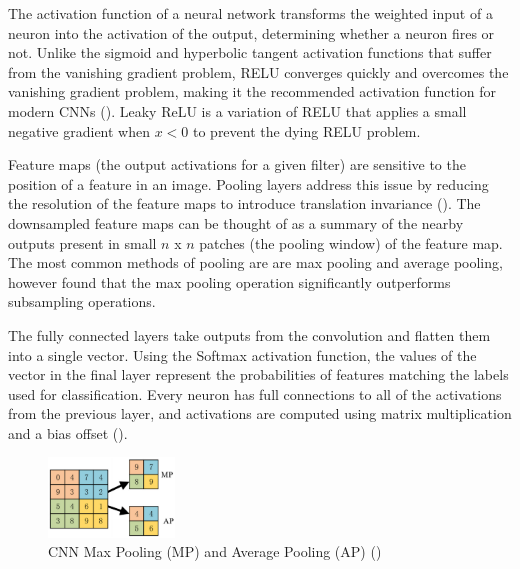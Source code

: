 The activation function of a neural network transforms the weighted input of a neuron into the activation of the output, determining whether a neuron fires or not. Unlike the sigmoid and hyperbolic tangent activation functions that suffer from the vanishing gradient problem, \acrfull{RELU} converges quickly and overcomes the vanishing gradient problem, making it the recommended activation function for modern \acrshort{CNN}s (\cite{nair_rectified_2010}). 
Leaky ReLU is a variation of \acrshort{RELU} that applies a small negative gradient when $x < 0$ to prevent the dying \acrshort{RELU} problem.

Feature maps (the output activations for a given filter) are sensitive to the position of a feature in an image. Pooling layers address this issue by reducing the resolution of the feature maps to introduce translation invariance (\cite{scherer_evaluation_2010}). The downsampled feature maps can be thought of as a summary of the nearby outputs present in small $n$ x $n$ patches (the pooling window) of the feature map. The most common methods of pooling are are max pooling and average pooling, however \cite{scherer_evaluation_2010} found that the max pooling operation significantly outperforms subsampling operations.

The fully connected layers take outputs from the convolution and flatten them into a single vector. Using the Softmax activation function, the values of the vector in the final layer represent the probabilities of features matching the labels used for classification. Every neuron has full connections to all of the activations from the previous layer, and activations are computed using matrix multiplication and a bias offset (\cite{stanford_cs231n_2019}).




\begin{figure}[ht!]
\centering
\includegraphics[width=0.30\textwidth]{media/literature/machine_learning/ml_pooling.png}
\caption[Diagram of CNN Max Pooling and Average Pooling ]{\acrshort{CNN} Max Pooling (MP) and Average Pooling (AP) (\cite{wang_pooling_2018})}
\label{fig:cnn_pooling}
\end{figure}


